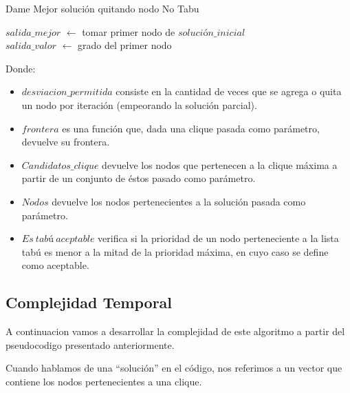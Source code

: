 \begin{algorithm}[H]
    \SetAlgoLined
    \caption{Dame Mejor solución quitando nodo No Tabu}

	$salida\_mejor$ $\leftarrow$ tomar primer nodo de $solución\_inicial$ \\
	$salida\_valor$ $\leftarrow$ grado del primer nodo \\

\end{algorithm}

Donde:
\begin{itemize}
 \item $desviacion\_permitida$ consiste en la cantidad de veces que se agrega o quita un nodo por iteración (empeorando la solución parcial).
 \item $frontera$ es una función que, dada una clique pasada como parámetro, devuelve su frontera.
 \item $Candidatos\_clique$ devuelve los nodos que pertenecen a la clique máxima a partir de un conjunto de éstos pasado como parámetro.
 \item $Nodos$ devuelve los nodos pertenecientes a la solución pasada como parámetro.
 \item $Es\ tabú\ aceptable$ verifica si la prioridad de un nodo perteneciente a la lista tabú es menor a la mitad de la prioridad máxima, en cuyo caso se define como aceptable.
\end{itemize}

\subsection{Complejidad Temporal}

 A continuacion vamos a desarrollar la complejidad de este algoritmo a partir del pseudocodigo presentado anteriormente. \newline

 Cuando hablamos de una ``solución'' en el código, nos referimos a un vector que contiene los nodos pertenecientes a una clique. \newline

